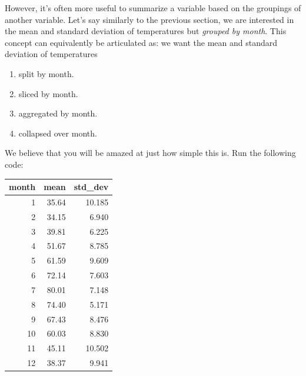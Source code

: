 \documentclass[]{tufte-book}
\newenvironment{Shaded}{\begin{snugshade}}{\end{snugshade}}
\newcommand{\KeywordTok}[1]{\textcolor[rgb]{0.13,0.29,0.53}{\textbf{{#1}}}}
\newcommand{\DataTypeTok}[1]{\textcolor[rgb]{0.13,0.29,0.53}{{#1}}}
\newcommand{\StringTok}[1]{\textcolor[rgb]{0.31,0.60,0.02}{{#1}}}
\newcommand{\OtherTok}[1]{\textcolor[rgb]{0.56,0.35,0.01}{{#1}}}
\newcommand{\NormalTok}[1]{{#1}}
\providecommand{\tightlist}{%
  \setlength{\itemsep}{0pt}\setlength{\parskip}{0pt}}
\theoremstyle{definition}
\theoremstyle{definition}
\theoremstyle{remark}
\begin{document}
However, it's often more useful to summarize a variable based on the
groupings of another variable. Let's say similarly to the previous
section, we are interested in the mean and standard deviation of
temperatures but \emph{grouped by month}. This concept can equivalently
be articulated as: we want the mean and standard deviation of
temperatures

\begin{enumerate}
\def\labelenumi{\arabic{enumi}.}
\tightlist
\item
  split by month.
\item
  sliced by month.
\item
  aggregated by month.
\item
  collapsed over month.
\end{enumerate}

We believe that you will be amazed at just how simple this is. Run the
following code:

\begin{Shaded}
\end{Shaded}

\begin{tabular}{r|r|r}
\hline
month & mean & std\_dev\\
\hline
1 & 35.64 & 10.185\\
\hline
2 & 34.15 & 6.940\\
\hline
3 & 39.81 & 6.225\\
\hline
4 & 51.67 & 8.785\\
\hline
5 & 61.59 & 9.609\\
\hline
6 & 72.14 & 7.603\\
\hline
7 & 80.01 & 7.148\\
\hline
8 & 74.40 & 5.171\\
\hline
9 & 67.43 & 8.476\\
\hline
10 & 60.03 & 8.830\\
\hline
11 & 45.11 & 10.502\\
\hline
12 & 38.37 & 9.941\\
\hline
\end{tabular}
\end{document}

